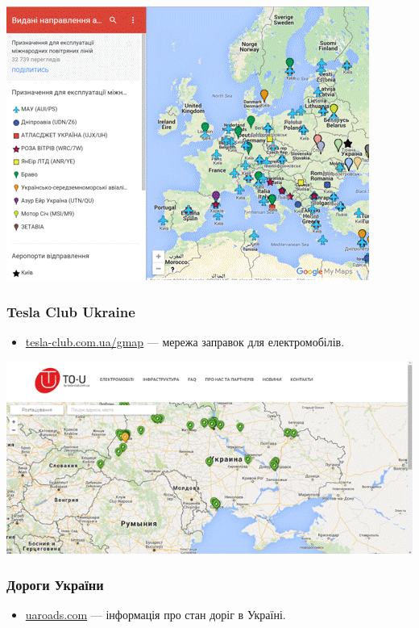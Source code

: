 \includegraphics{images/029.gif}

\subsubsection{Tesla Club Ukraine}

\begin{itemize}
    \item \href{http://tesla-club.com.ua/gmap}{tesla-club.com.ua/gmap} — мережа заправок для електромобілів.
\end{itemize}

\includegraphics{images/030.gif}

\subsubsection{Дороги України}

\begin{itemize}
    \item \href{http://uaroads.com/}{uaroads.com} — інформація про стан доріг в Україні.
\end{itemize}

